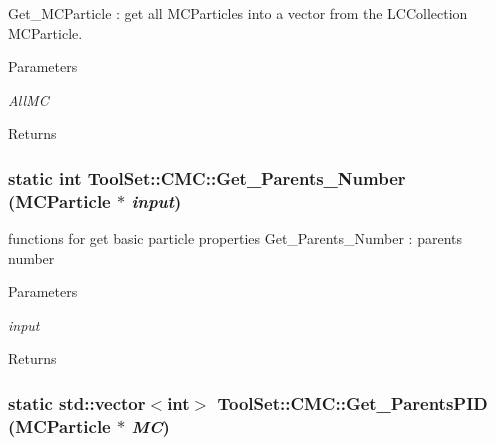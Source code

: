 Get\_\-MCParticle : get all MCParticles into a vector from the LCCollection MCParticle. 
\begin{DoxyParams}{Parameters}
\item[{\em AllMC}]\end{DoxyParams}
\begin{DoxyReturn}{Returns}

\end{DoxyReturn}
\hypertarget{classToolSet_1_1CMC_a67ab1d51b7fd0f98cfa19be5381e961a}{
\subsubsection[{Get\_\-Parents\_\-Number}]{\setlength{\rightskip}{0pt plus 5cm}static int ToolSet::CMC::Get\_\-Parents\_\-Number (MCParticle $\ast$ {\em input})}}
\label{classToolSet_1_1CMC_a67ab1d51b7fd0f98cfa19be5381e961a}


functions for get basic particle properties Get\_\-Parents\_\-Number : parents number 
\begin{DoxyParams}{Parameters}
\item[{\em input}]\end{DoxyParams}
\begin{DoxyReturn}{Returns}

\end{DoxyReturn}
\hypertarget{classToolSet_1_1CMC_aa98186321fc75d5f476bc97511e1d91b}{
\subsubsection[{Get\_\-ParentsPID}]{\setlength{\rightskip}{0pt plus 5cm}static std::vector$<$int$>$ ToolSet::CMC::Get\_\-ParentsPID (MCParticle $\ast$ {\em MC})}}
\label{classToolSet_1_1CMC_aa98186321fc75d5f476bc97511e1d91b}


